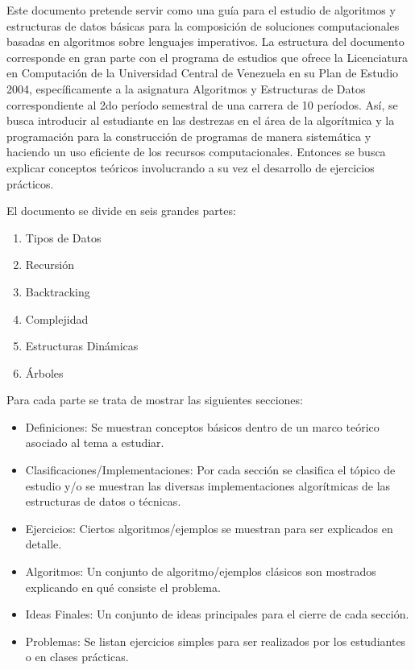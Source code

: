 
Este documento pretende servir como una guía para el estudio de algoritmos y estructuras de datos básicas para la composición de soluciones computacionales basadas en algoritmos sobre lenguajes imperativos. La estructura del documento corresponde en gran parte con el programa de estudios que ofrece la Licenciatura en Computación de la Universidad Central de Venezuela en su Plan de Estudio 2004, específicamente a la asignatura Algoritmos y Estructuras de Datos correspondiente al 2do período semestral de una carrera de 10 períodos. Así, se busca introducir al estudiante en las destrezas en el área de la algorítmica y la programación para la construcción de programas de manera sistemática y haciendo un uso eficiente de los recursos computacionales. Entonces se busca explicar conceptos teóricos involucrando a su vez el desarrollo de ejercicios prácticos.

El documento se divide en seis grandes partes:

\begin{enumerate}
\item Tipos de Datos
\item Recursión
\item Backtracking
\item Complejidad
\item Estructuras Dinámicas
\item Árboles
\end{enumerate}

Para cada parte se trata de mostrar las siguientes secciones:
\begin{itemize}
\item Definiciones: Se muestran conceptos básicos dentro de un marco teórico asociado al tema a estudiar.
\item Clasificaciones/Implementaciones: Por cada sección se clasifica el tópico de estudio y/o se muestran las diversas implementaciones algorítmicas de las estructuras de datos o técnicas.
\item Ejercicios: Ciertos algoritmos/ejemplos se muestran para ser explicados en detalle.
\item Algoritmos: Un conjunto de algoritmo/ejemplos clásicos son mostrados explicando en qué consiste el problema.
\item Ideas Finales: Un conjunto de ideas principales para el cierre de cada sección.
\item Problemas: Se listan ejercicios simples para ser realizados por los estudiantes o en clases prácticas.
\end{itemize}

